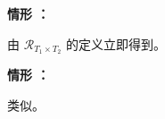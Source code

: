 \begin{taplauthorsolutionentrybox}
\medskip\noindent
\textbf{情形 ：}

由 \(\mathcal R_{T_1\times T_2}\) 的定义立即得到。

\medskip\noindent
\textbf{情形 ：}

类似。

\end{taplauthorsolutionentrybox}
